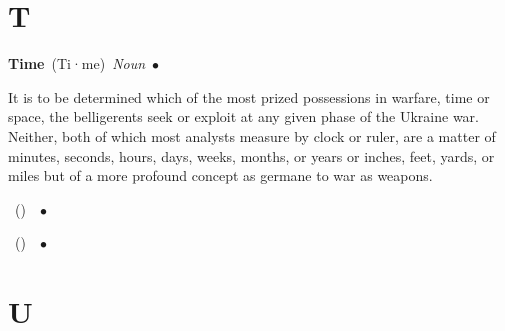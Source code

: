 \documentclass[10pt,a4paper,twoside]{article} %
\newcommand{\entry}[4]{\markboth{#1}{#1}\textbf{#1}\ {(#2)}\ \textit{#3}\ $\bullet$\ {#4}}  %
\begin{document}

\section*{T}

\begin{multicols}{2}

\entry{Time} {Ti·me} {Noun} {

It is to be determined which of the most prized possessions in warfare, time or space, the belligerents seek or exploit at any given phase of the Ukraine war. Neither, both of which most analysts measure by clock or ruler, are a matter of minutes, seconds, hours, days, weeks, months, or years or inches, feet, yards, or miles but of a more profound concept as germane to war as weapons. 

}

\entry{} {} {} { 



}

\entry{} {} {} {


}


\end{multicols}


\section*{U}
\end{document}
